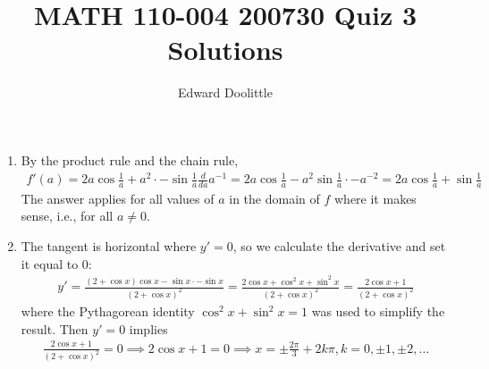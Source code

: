 \documentclass[12pt]{article}
\title{MATH 110-004 200730 Quiz 3 Solutions}
\author{Edward Doolittle}
\begin{document}
\maketitle

\begin{enumerate}
\item By the product rule and the chain rule,
  \begin{align*}
    f'(a) = 2a \cos \frac{1}{a} 
      + a^2 \cdot -\sin \frac{1}{a} \frac{d}{da} a^{-1}
      = 2a \cos \frac{1}{a} - a^2 \sin \frac{1}{a} \cdot -a^{-2}
      = 2a \cos \frac{1}{a} + \sin \frac{1}{a}
  \end{align*}
  The answer applies for all values of $a$ in the domain of $f$ where it
  makes sense, i.e., for all $a\ne 0$.
\item The tangent is horizontal where $y'=0$, so we calculate the
  derivative and set it equal to $0$:
  \begin{align*}
    y' = \frac{(2+\cos x)\cos x - \sin x \cdot -\sin x}{(2+\cos x)^2}
    = \frac{2\cos x + \cos^2 x + \sin^2 x}{(2+\cos x)^2}
    = \frac{2\cos x + 1}{(2+\cos x)^2}
  \end{align*}
  where the Pythagorean identity $\cos^2 x + \sin^2 x = 1$ was used to
  simplify the result.  Then $y'=0$ implies
  \begin{align*}
    \frac{2\cos x + 1}{(2+\cos x)^2} = 0
    \implies 2\cos x + 1 = 0
    \implies x = \pm \frac{2\pi}{3} + 2k\pi, k=0, \pm 1, \pm 2, \ldots
  \end{align*}
\end{enumerate}
\end{document}
